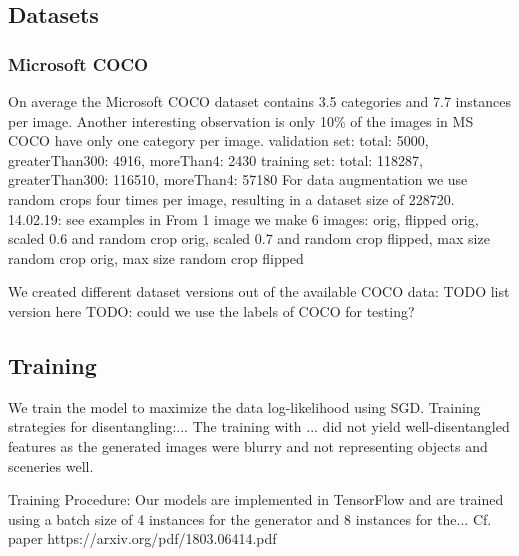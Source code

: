 \documentclass[12pt,a4paper]{article}
\begin{document}
\subsection{Datasets}
\subsubsection{Microsoft COCO}
On average the Microsoft COCO dataset \cite{1405.0312} contains 3.5 categories and 7.7 instances per image. Another interesting observation is only 10\% of the images in MS COCO have only one category per image.
validation set: total: 5000, greaterThan300: 4916, moreThan4: 2430
training set: total: 118287, greaterThan300: 116510, moreThan4: 57180
For data augmentation we use random crops four times per image, resulting in a dataset size of 228720.
14.02.19: see examples in 
From 1 image we make 6 images: orig, flipped orig, scaled 0.6 and random crop orig, scaled 0.7 and random crop flipped, max size random crop orig, max size random crop flipped

We created different dataset versions out of the available COCO data:
TODO list version here
TODO: could we use the labels of COCO for testing?



\subsection{Training}
We train the model to maximize the data log-likelihood using SGD.
Training strategies for disentangling:...
The training with ... did not yield well-disentangled features as the generated images were blurry and not representing objects and sceneries well. 

\par Training Procedure: Our models are implemented in TensorFlow \cite{1605.08695} and are trained using a batch size of 4 instances for the generator and 8 instances for the...
Cf. paper https://arxiv.org/pdf/1803.06414.pdf
\end{document}
